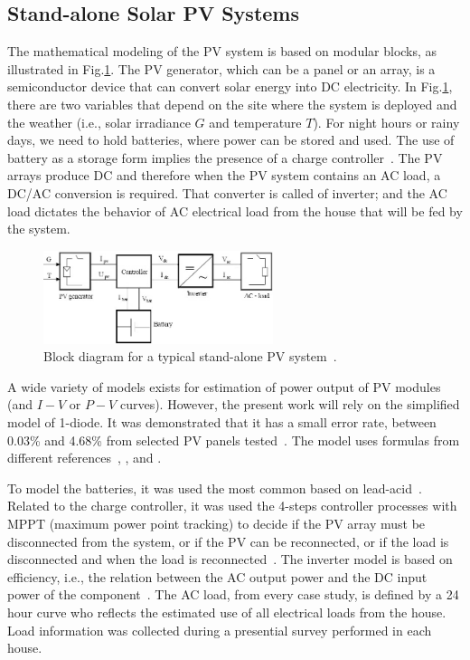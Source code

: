 \documentclass[runningheads]{llncs}
\begin{document}
\subsection{Stand-alone Solar PV Systems}
The mathematical modeling of the PV system is based on modular blocks, as illustrated in Fig.\ref{fig:blockdiagram}. %
The PV generator, which can be a panel or an array, is a semiconductor device that can convert solar energy into DC electricity. In Fig.\ref{fig:blockdiagram}, there are two variables that depend on the site where the system is deployed and the weather (i.e., solar irradiance $G$ and temperature $T$). For night hours or rainy days, we need to hold batteries, where power can be stored and used. The use of battery as a storage form implies the presence of a charge controller~\cite{Hansen}. The PV arrays produce DC and therefore when the PV system contains an AC load, a DC/AC conversion is required. That converter is called of inverter; and the AC load dictates the behavior of AC electrical load from the house that will be fed by the system.
\begin{figure}[h]
\includegraphics[width=0.6\textwidth]{blockdiagramPVS2}
\centering
\caption{Block diagram for a typical stand-alone PV system~\cite{Hansen}.}
\label{fig:blockdiagram} 
\end{figure}
A wide variety of models exists for estimation of power output of PV modules (and $I-V$ or $P-V$ curves). However, the present work will rely on the simplified model of 1-diode. It was demonstrated that it has a small error rate, between 0.03\% and 4.68\% from selected PV panels tested~\cite{Saloux}. The model uses formulas from different references~\cite{Hansen}, \cite{Saloux}, and \cite{Ross}.

To model the batteries, it was used the most common based on lead-acid~\cite{Copetti}. Related to the charge controller, it was used the 4-steps controller processes with MPPT (maximum power point tracking) to decide if the PV array must be disconnected from the system, or if the PV can be reconnected, or if the load is disconnected and when the load is reconnected~\cite{Hansen}. The inverter model is based on efficiency, i.e., the relation between the AC output power and the DC input power of the component~\cite{Hansen}. The AC load, from every case study, is defined by a 24 hour curve who reflects the estimated use of all electrical loads from the house. Load information was collected during a presential survey performed in each house.
\end{document}
